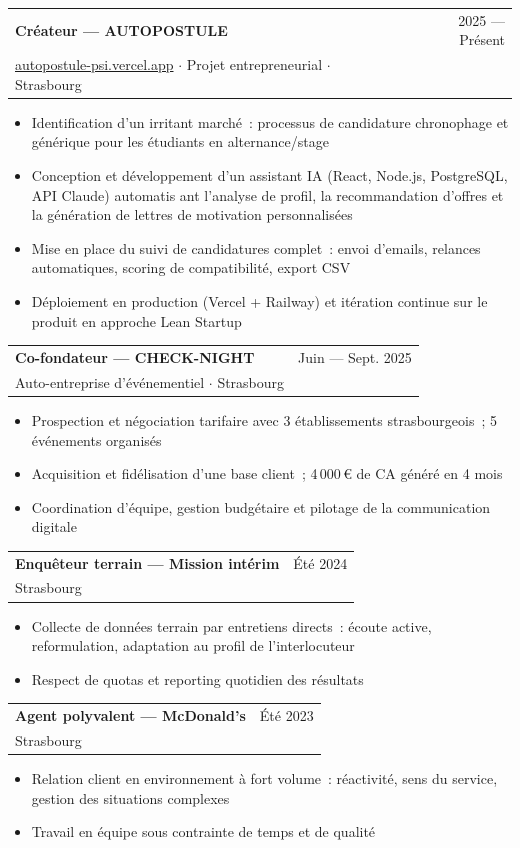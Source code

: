 \documentclass[10.5pt,a4paper]{article}
\makeatletter
\newcommand{\cventry}[4]{
    \noindent
    \begin{tabularx}{\linewidth}{@{}X r@{}}
        \textbf{\small #1} & {\footnotesize\color{graytext}#2} \\
        {\footnotesize\color{graytext}#3} & \\
    \end{tabularx}
    \vspace{1pt}
    #4
    \vspace{5pt}
}
\makeatother
\begin{document}
{\begin{minipage}[t][297mm][t]{0.62\textwidth}
\begin{minipage}[t]{0.88\linewidth}
\cventry{Cr\'eateur — AUTOPOSTULE}{2025 — Pr\'esent}{\href{https://autopostule-psi.vercel.app}{autopostule-psi.vercel.app} $\cdot$ Projet entrepreneurial $\cdot$ Strasbourg}{
\begin{itemize}
    \item Identification d'un irritant march\'e~: processus de candidature chronophage et g\'en\'erique pour les \'etudiants en alternance/stage
    \item Conception et d\'eveloppement d'un assistant IA (React, Node.js, PostgreSQL, API Claude) automatis ant l'analyse de profil, la recommandation d'offres et la g\'en\'eration de lettres de motivation personnalis\'ees
    \item Mise en place du suivi de candidatures complet~: envoi d'emails, relances automatiques, scoring de compatibilit\'e, export CSV
    \item D\'eploiement en production (Vercel + Railway) et it\'eration continue sur le produit en approche Lean Startup
\end{itemize}
}

\cventry{Co-fondateur — CHECK-NIGHT}{Juin — Sept. 2025}{Auto-entreprise d'\'ev\'enementiel $\cdot$ Strasbourg}{
\begin{itemize}
    \item Prospection et n\'egociation tarifaire avec 3 \'etablissements strasbourgeois~; 5 \'ev\'enements organis\'es
    \item Acquisition et fid\'elisation d'une base client~; 4\,000\,\euro{} de CA g\'en\'er\'e en 4 mois
    \item Coordination d'\'equipe, gestion budg\'etaire et pilotage de la communication digitale
\end{itemize}
}

\cventry{Enqu\^eteur terrain — Mission int\'erim}{\'Et\'e 2024}{Strasbourg}{
\begin{itemize}
    \item Collecte de donn\'ees terrain par entretiens directs~: \'ecoute active, reformulation, adaptation au profil de l'interlocuteur
    \item Respect de quotas et reporting quotidien des r\'esultats
\end{itemize}
}

\cventry{Agent polyvalent — McDonald's}{\'Et\'e 2023}{Strasbourg}{
\begin{itemize}
    \item Relation client en environnement \`a fort volume~: r\'eactivit\'e, sens du service, gestion des situations complexes
    \item Travail en \'equipe sous contrainte de temps et de qualit\'e
\end{itemize}
}


\end{minipage}
\end{minipage}}
\end{document}

